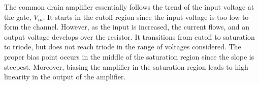 The common drain amplifier essentially follows the trend of the input voltage at the gate, $V_{in}$. It starts in the cutoff region since the input voltage is too low to form the channel. However, as the input is increased, the current flows, and an output voltage develops over the resistor. It transitions from cutoff to saturation to triode, but does not reach triode in the range of voltages considered. The proper bias point occurs in the middle of the saturation region since the slope is steepest. Moreover, biasing the amplifier in the saturation region leads to high linearity in the output of the amplifier.
